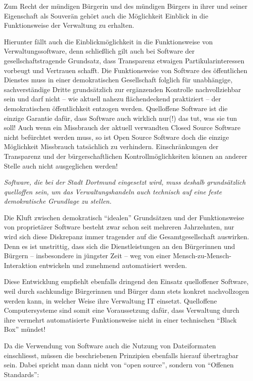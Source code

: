 \documentclass[a4paper]{scrartcl}
\begin{document}
Zum Recht der mündigen Bürgerin und des mündigen Bürgers in ihrer und seiner
Eigenschaft als Souverän gehört auch die Möglichkeit Einblick in die
Funktionsweise der Verwaltung zu erhalten.

Hierunter fällt auch die Einblickmöglichkeit in die Funktionsweise von
Verwaltungssoftware, denn schließlich gilt auch bei Software der
gesellschaftstragende Grundsatz, dass Transparenz etwaigen Partikularinteressen
vorbeugt und Vertrauen schafft. Die Funktionsweise von Software des öffentlichen
Dienstes muss in einer demokratischen Gesellschaft folglich für unabhängige,
sachverständige Dritte grundsätzlich zur ergänzenden Kontrolle nachvollziehbar
sein und darf nicht -- wie aktuell nahezu flächendeckend praktiziert -- der
demokratischen öffentlichkeit entzogen werden. Quelloffene Software ist die
einzige Garantie dafür, dass Software auch wirklich nur(!) das tut, was sie tun
soll! Auch wenn ein Missbrauch der aktuell verwandten Closed Source Software
nicht befürchtet werden muss, so ist Open Source Software doch die einzige
Möglichkeit Missbrauch tatsächlich zu verhindern. Einschränkungen der
Transparenz und der bürgerschaftlichen Kontrollmöglichkeiten können an anderer
Stelle auch nicht ausgeglichen werden!

\emph{Software, die bei der Stadt Dortmund eingesetzt wird, muss deshalb grundsätzlich
quelloffen sein, um das Verwaltungshandeln auch technisch auf eine feste
demokratische Grundlage zu stellen.}

Die Kluft zwischen demokratisch ``idealen'' Grundsätzen und der Funktionsweise
von proprietärer Software besteht zwar schon seit mehreren Jahrzehnten, nur wird
sich diese Diskrepanz immer tragender auf die Gesamtgesellschaft auswirken. Denn
es ist unstrittig, dass sich die Dienstleistungen an den Bürgerinnen und Bürgern
-- insbesondere in jüngster Zeit -- weg von einer Mensch-zu-Mensch-Interaktion
entwickeln und zunehmend automatisiert werden.

Diese Entwicklung empfiehlt ebenfalls dringend den Einsatz quelloffener
Software, weil durch sachkundige Bürgerinnen und Bürger dann stets konkret
nachvollzogen werden kann, in welcher Weise ihre Verwaltung IT
einsetzt. Quelloffene Computersysteme sind somit eine Voraussetzung dafür, dass
Verwaltung durch ihre vermehrt automatisierte Funktionsweise nicht in einer
technischen ``Black Box'' mündet!

Da die Verwendung von Software auch die Nutzung von Dateiformaten einschliesst,
müssen die beschriebenen Prinzipien ebenfalls hierauf übertragbar sein. Dabei
spricht man dann nicht von ``open source'', sondern von ``Offenen Standards'':
\end{document}
